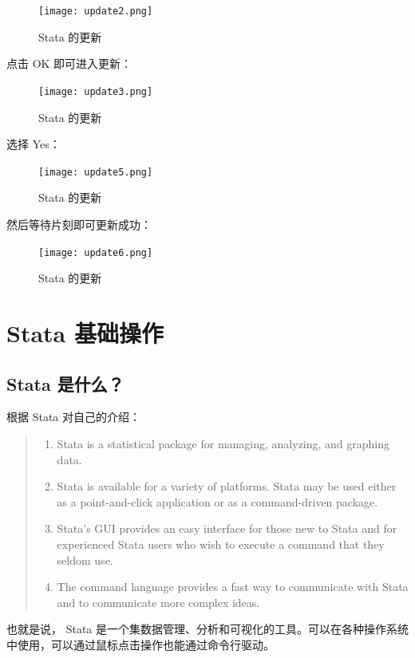 \documentclass[cn,fancy,blue,11pt]{elegantbook}
\begin{document}
\begin{figure}[htbp]
  \centering
  \texttt{[image: update2.png]}
  \caption{Stata 的更新}
  \label{fig:update2}
\end{figure}


点击 OK 即可进入更新：

\begin{figure}[htbp]
  \centering
  \texttt{[image: update3.png]}
  \caption{Stata 的更新}
  \label{fig:update3}
\end{figure}

选择 Yes：

\begin{figure}[htbp]
  \centering
  \texttt{[image: update5.png]}
  \caption{Stata 的更新}
  \label{fig:update5}
\end{figure}

然后等待片刻即可更新成功：

\begin{figure}[htbp]
  \centering
  \texttt{[image: update6.png]}
  \caption{Stata 的更新}
  \label{fig:update6}
\end{figure}

\chapter{Stata 基础操作}
\section{Stata 是什么？}

根据 Stata 对自己的介绍：

\begin{quote}
\begin{enumerate}
\item  Stata is a statistical package for managing, analyzing, and graphing data.
\item  Stata is available for a variety of platforms. Stata may be used either as a point-and-click application or as a command-driven package.
\item  Stata's GUI provides an easy interface for those new to Stata and for experienced Stata users who  wish to execute a command that they seldom use.
\item  The command language provides a fast way to communicate with Stata and to communicate more complex ideas.
\end{enumerate}
\end{quote}

也就是说， Stata 是一个集数据管理、分析和可视化的工具。可以在各种操作系统中使用，可以通过鼠标点击操作也能通过命令行驱动。
\end{document}
